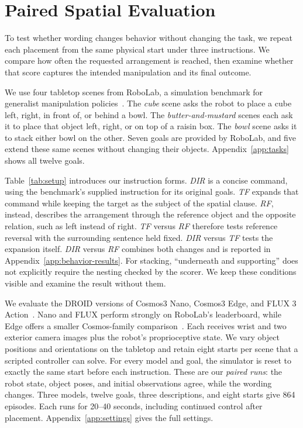 \documentclass{article}
\begin{document}
\section{Paired Spatial Evaluation}
To test whether wording changes behavior without changing the task, we repeat each placement from the same physical start under three instructions. We compare how often the requested arrangement is reached, then examine whether that score captures the intended manipulation and its final outcome.

We use four tabletop scenes from RoboLab, a simulation benchmark for generalist manipulation policies~\citep{yang2026robolab}. The \textit{cube} scene asks the robot to place a cube left, right, in front of, or behind a bowl. The \textit{butter-and-mustard} scenes each ask it to place that object left, right, or on top of a raisin box. The \textit{bowl} scene asks it to stack either bowl on the other. Seven goals are provided by RoboLab, and five extend these same scenes without changing their objects. Appendix~\ref{app:tasks} shows all twelve goals.

Table~\ref{tab:setup} introduces our instruction forms. \textit{DIR} is a concise command, using the benchmark's supplied instruction for its original goals. \textit{TF} expands that command while keeping the target as the subject of the spatial clause. \textit{RF}, instead, describes the arrangement through the reference object and the opposite relation, such as left instead of right. \textit{TF} versus \textit{RF} therefore tests reference reversal with the surrounding sentence held fixed. \textit{DIR} versus \textit{TF} tests the expansion itself. \textit{DIR} versus \textit{RF} combines both changes and is reported in Appendix~\ref{app:behavior-results}. For stacking, ``underneath and supporting'' does not explicitly require the nesting checked by the scorer. We keep these conditions visible and examine the result without them.

We evaluate the DROID versions of Cosmos3 Nano, Cosmos3 Edge, and FLUX 3 Action~\citep{nvidia2026nano,nvidia2026edge,bfl2026fluxaction}. Nano and FLUX perform strongly on RoboLab's leaderboard, while Edge offers a smaller Cosmos-family comparison~\citep{robolab2026leaderboard}. Each receives wrist and two exterior camera images plus the robot's proprioceptive state. We vary object positions and orientations on the tabletop and retain eight starts per scene that a scripted controller can solve. For every model and goal, the simulator is reset to exactly the same start before each instruction. These are our \emph{paired runs}: the robot state, object poses, and initial observations agree, while the wording changes. Three models, twelve goals, three descriptions, and eight starts give 864 episodes. Each runs for 20--40 seconds, including continued control after placement. Appendix~\ref{app:settings} gives the full settings.
\end{document}
